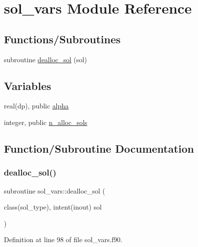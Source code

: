 \hypertarget{namespacesol__vars}{}\section{sol\+\_\+vars Module Reference}
\label{namespacesol__vars}
\subsection*{Functions/\+Subroutines}
\begin{DoxyCompactItemize}
\item 
subroutine \hyperlink{namespacesol__vars_a9ae65a5252aede548e5238e50c1bb2ba}{dealloc\+\_\+sol} (sol)
\end{DoxyCompactItemize}
\subsection*{Variables}
\begin{DoxyCompactItemize}
\item 
real(dp), public \hyperlink{namespacesol__vars_adbe33095cf2396e4a5c9108d7d1dcf11}{alpha}
\item 
integer, public \hyperlink{namespacesol__vars_a91634d69ba45b896816f40e9013ddc79}{n\+\_\+alloc\+\_\+sols}
\end{DoxyCompactItemize}


\subsection{Function/\+Subroutine Documentation}
\mbox{\label{namespacesol__vars_a9ae65a5252aede548e5238e50c1bb2ba}} 
\subsubsection{\texorpdfstring{dealloc\+\_\+sol()}{dealloc\_sol()}}
{\footnotesize\ttfamily subroutine sol\+\_\+vars\+::dealloc\+\_\+sol (\begin{DoxyParamCaption}\item[{class(sol\+\_\+type), intent(inout)}]{sol }\end{DoxyParamCaption})}



Definition at line 98 of file sol\+\_\+vars.\+f90.

